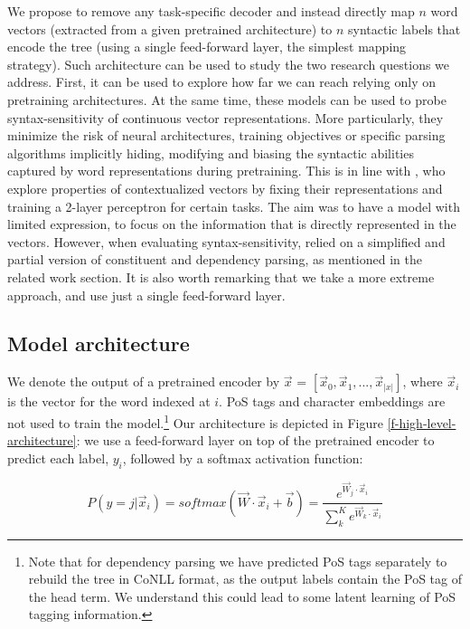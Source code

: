 \documentclass[letterpaper]{article} %
\newcommand{\citet}[1]{\citeauthor{#1} \shortcite{#1}}
\begin{document}
We propose to remove any task-specific decoder and instead directly map $n$ word vectors (extracted from a given pretrained architecture) to $n$ syntactic labels that encode the tree (using a single feed-forward layer, the simplest mapping strategy). Such architecture can be used to study the two research questions we address. First, it can be used to explore how far we can reach relying only on pretraining architectures. At the same time, these models can be used to probe syntax-sensitivity of continuous vector representations. More particularly, they minimize the risk of neural architectures, training objectives or specific parsing algorithms implicitly hiding, modifying and biasing the syntactic abilities captured by word representations during pretraining.
This is in line with \citet{tenney2018you}, who explore properties of contextualized
vectors by fixing their representations and training a 2-layer perceptron for certain tasks. The aim was to have a model with limited expression, to focus on the information that is directly represented in the vectors. However, when evaluating syntax-sensitivity, \citeauthor{tenney2018you} relied on a simplified and partial version of constituent and dependency parsing, as mentioned in the related work section.
It is also worth remarking that we take a more extreme approach, and use just a single feed-forward layer.


\subsection{Model architecture}\label{section-models}
We denote the output of a pretrained encoder by $\vec{x}$ = $[\vec{x}_0,\vec{x}_1,...,\vec{x}_{|x|}]$, where $\vec{x}_i$ is the vector for the word indexed at $i$. PoS tags and character embeddings are not used to train the model.\footnote{Note that for dependency parsing we have predicted PoS tags separately to rebuild the tree in CoNLL format, as the output labels contain the PoS tag of the head term. We understand this could lead to some latent learning of PoS tagging information.}
Our architecture is depicted in Figure \ref{f-high-level-architecture}: we use a feed-forward layer
on top of the pretrained encoder to predict each label, $y_i$, followed by a softmax activation function:

\begin{equation}
P(y=j|\vec{x}_i) = \mathit{softmax}(\vec{W} \cdot \vec{x}_i + \vec{b}) = \frac{e^{\vec{W}_j \cdot \vec{x}_i}}{\sum_{k}^{K}{e^{\vec{W}_k \cdot \vec{x}_i}}}
\end{equation}
\end{document}
